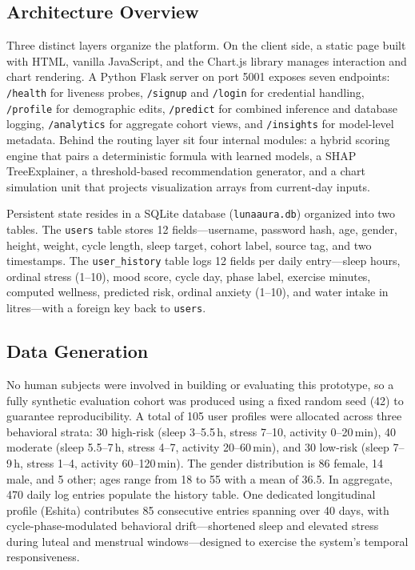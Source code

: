 \documentclass[conference]{IEEEtran}
\begin{document}
\subsection{Architecture Overview}
Three distinct layers organize the platform. On the client side, a static page built with HTML, vanilla JavaScript, and the Chart.js library manages interaction and chart rendering. A Python Flask server on port 5001 exposes seven endpoints: \texttt{/health} for liveness probes, \texttt{/signup} and \texttt{/login} for credential handling, \texttt{/profile} for demographic edits, \texttt{/predict} for combined inference and database logging, \texttt{/analytics} for aggregate cohort views, and \texttt{/insights} for model-level metadata. Behind the routing layer sit four internal modules: a hybrid scoring engine that pairs a deterministic formula with learned models, a SHAP TreeExplainer, a threshold-based recommendation generator, and a chart simulation unit that projects visualization arrays from current-day inputs.

Persistent state resides in a SQLite database (\texttt{lunaaura.db}) organized into two tables. The \texttt{users} table stores 12 fields---username, password hash, age, gender, height, weight, cycle length, sleep target, cohort label, source tag, and two timestamps. The \texttt{user\_history} table logs 12 fields per daily entry---sleep hours, ordinal stress (1--10), mood score, cycle day, phase label, exercise minutes, computed wellness, predicted risk, ordinal anxiety (1--10), and water intake in litres---with a foreign key back to \texttt{users}.

\subsection{Data Generation}
No human subjects were involved in building or evaluating this prototype, so a fully synthetic evaluation cohort was produced using a fixed random seed (42) to guarantee reproducibility. A total of 105 user profiles were allocated across three behavioral strata: 30 high-risk (sleep 3--5.5\,h, stress 7--10, activity 0--20\,min), 40 moderate (sleep 5.5--7\,h, stress 4--7, activity 20--60\,min), and 30 low-risk (sleep 7--9\,h, stress 1--4, activity 60--120\,min). The gender distribution is 86 female, 14 male, and 5 other; ages range from 18 to 55 with a mean of 36.5. In aggregate, 470 daily log entries populate the history table. One dedicated longitudinal profile (Eshita) contributes 85 consecutive entries spanning over 40 days, with cycle-phase-modulated behavioral drift---shortened sleep and elevated stress during luteal and menstrual windows---designed to exercise the system's temporal responsiveness.
\end{document}
